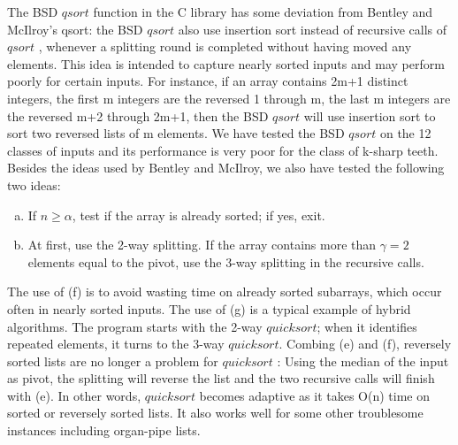 \documentclass[AMA,STIX1COL]{WileyNJD-v2}
\newcommand{\qusort}{$quicksort$ }
\newcommand{\qusortn}{$quicksort$}
\newcommand{\qsort}{$qsort$ }
\begin{document}
The BSD \qsort function in the C library has some deviation from Bentley and McIlroy’s qsort: the BSD \qsort also use insertion sort instead of recursive calls of \qsort, whenever a splitting round is completed without having moved any elements. 
This idea is intended to capture nearly sorted inputs and may perform poorly for certain inputs. 
For instance, if an array contains 2m+1 distinct integers, the first m integers are the reversed 1 through m, the last m integers are the reversed m+2 through 2m+1, then the BSD \qsort will use insertion sort to sort two reversed lists of m elements. 
We have tested the BSD \qsort on the 12 classes of inputs and its performance is very poor for the class of k-sharp teeth. 
Besides the ideas used by Bentley and McIlroy, we also have tested the following two ideas:

\begin{enumerate}[(f)]
\item If $n \geq \alpha$, test if the array is already sorted; if yes, exit.
\item At first, use the 2-way splitting. If the array contains more than $\gamma = 2$ elements equal to the pivot, use the 3-way splitting in the recursive calls.
\end{enumerate}

The use of (f) is to avoid wasting time on already sorted subarrays, which occur often in nearly sorted inputs. 
The use of (g) is a typical example of hybrid algorithms.  
The program starts with the 2-way \qusortn; when it identifies repeated elements, it turns to the 3-way \qusortn. 
Combing (e) and (f), reversely sorted lists are no longer a problem for \qusort: Using the median of the input as pivot, the splitting will reverse the list and the two recursive calls will finish with (e). 
In other words, \qusort becomes adaptive as it takes O(n) time on sorted or reversely sorted lists. 
It also works well for some other troublesome instances including organ-pipe lists.
\end{document}
